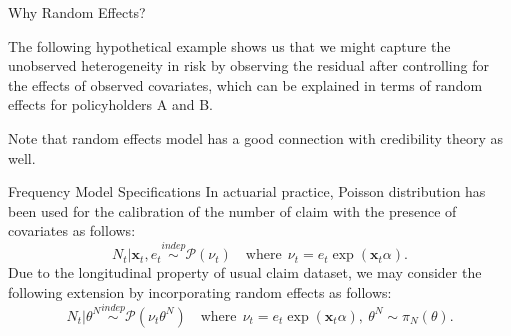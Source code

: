 \documentclass[ignorenonframetext,]{beamer}
\begin{document}
\begin{frame}{Why Random Effects?}

The following hypothetical example shows us that we might capture the
\color{purple} unobserved heterogeneity in risk \color{black} by
observing the residual after controlling for the effects of observed
covariates, which can be explained in terms of \color{purple} random
effects \color{black} for policyholders A and B.

\begin{table}[h!t!]
\centering
{}
\end{table}
Note that random effects model has a good connection with  \color{purple} credibility theory  \color{black} as well.
\end{frame}

\begin{frame}{Frequency Model Specifications}
In actuarial practice, Poisson distribution has been used for the calibration of the number of claim with the presence of covariates as follows:
\begin{equation}\label{p2:eq:pois}
N_t|\mathbf{x}_t, e_t \overset{indep}{\sim} \mathcal{P}(\nu_t) \quad \text{where} \ \ \nu_t = e_t \exp(\mathbf{x}_t \alpha).
\end{equation}
Due to the longitudinal property of usual claim dataset, we may consider the following extension by incorporating random effects as follows:
\begin{equation}\label{p2:eq:poisre}
N_t|\theta^N \overset{indep}{\sim} \mathcal{P}(\nu_t \theta^N) \quad \text{where} \ \ \nu_t = e_t \exp(\mathbf{x}_t \alpha), \ \theta^N \sim \pi_N(\theta).
\end{equation}
\end{frame}
\end{document}
